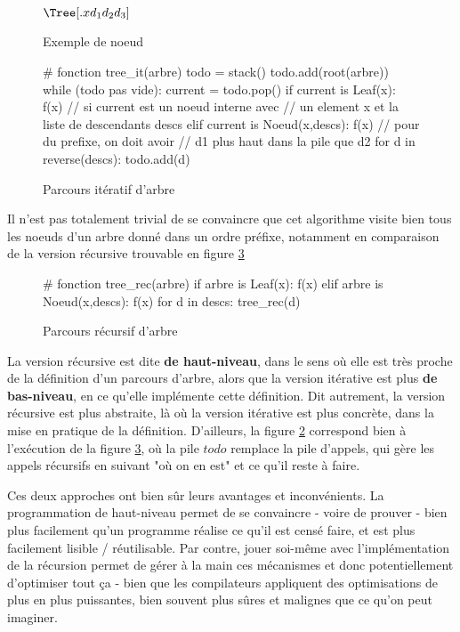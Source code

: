 \begin{figure}[!ht]
\centering
$\Tree[.x d_1 d_2 d_3 ]$
\caption{Exemple de noeud}
\label{simparbre}
\end{figure}

\begin{figure}[!ht]
\begin{python}
# fonction tree_it(arbre)
todo = stack()
todo.add(root(arbre))
while (todo pas vide):
    current = todo.pop()
    if current is Leaf(x):
        f(x)
    // si current est un noeud interne avec 
    // un element x et la liste de descendants descs
    elif current is Noeud(x,descs):
        f(x)
        // pour du prefixe, on doit avoir
        // d1 plus haut dans la pile que d2
        for d in reverse(descs):
             todo.add(d)

\end{python}
\caption{Parcours itératif d'arbre}
\label{treeit}
\end{figure}

Il n'est pas totalement trivial de se convaincre que cet algorithme visite bien tous les noeuds d'un arbre donné dans un ordre préfixe, notamment en comparaison de la version récursive trouvable en figure \ref{treerec}

\begin{figure}[!ht]
\begin{python}
# fonction tree_rec(arbre)
if arbre is Leaf(x):
    f(x)
elif arbre is Noeud(x,descs):
    f(x)
    for d in descs:
        tree_rec(d)
\end{python}
\caption{Parcours récursif d'arbre}
\label{treerec}
\end{figure}

La version récursive est dite \textbf{de haut-niveau}, dans le sens où elle est très proche de la définition d'un parcours d'arbre, alors que la version itérative est plus \textbf{de bas-niveau}, en ce qu'elle implémente cette définition. Dit autrement, la version récursive est plus abstraite, là où la version itérative est plus concrète, dans la mise en pratique de la définition. D'ailleurs, la figure \ref{treeit} correspond bien à l'exécution de la figure \ref{treerec}, où la pile $todo$ remplace la pile d'appels, qui gère les appels récursifs en suivant "où on en est" et ce qu'il reste à faire.

Ces deux approches ont bien sûr leurs avantages et inconvénients. La programmation de haut-niveau permet de se convaincre - voire de prouver - bien plus facilement qu'un programme réalise ce qu'il est censé faire, et est plus facilement lisible / réutilisable. Par contre, jouer soi-même avec l'implémentation de la récursion permet de gérer à la main ces mécanismes et donc potentiellement d'optimiser tout ça - bien que les compilateurs appliquent des optimisations de plus en plus puissantes, bien souvent plus sûres et malignes que ce qu'on peut imaginer. 

